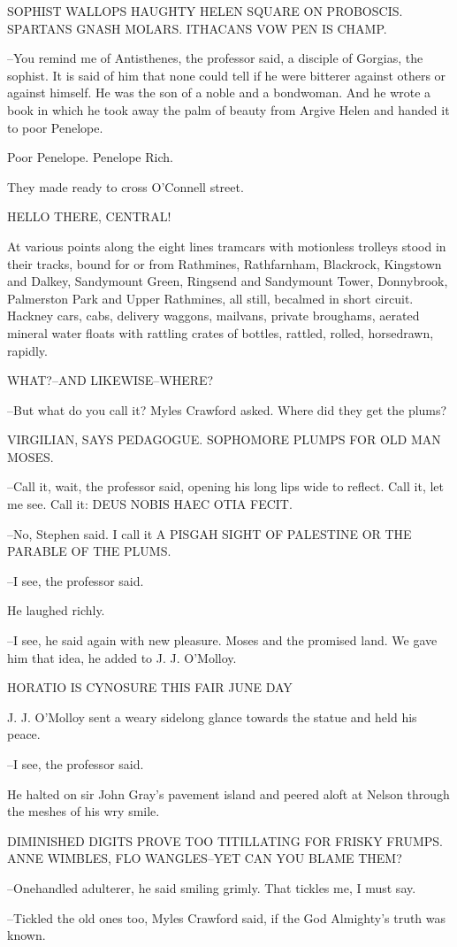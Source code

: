     SOPHIST WALLOPS HAUGHTY HELEN SQUARE ON
    PROBOSCIS. SPARTANS GNASH MOLARS. ITHACANS
    VOW PEN IS CHAMP.


--You remind me of Antisthenes, the professor said, a disciple of
Gorgias, the sophist. It is said of him that none could tell if he were
bitterer against others or against himself. He was the son of a noble and
a bondwoman. And he wrote a book in which he took away the palm of beauty
from Argive Helen and handed it to poor Penelope.

Poor Penelope. Penelope Rich.

They made ready to cross O'Connell street.


    HELLO THERE, CENTRAL!


At various points along the eight lines tramcars with motionless
trolleys stood in their tracks, bound for or from Rathmines, Rathfarnham,
Blackrock, Kingstown and Dalkey, Sandymount Green, Ringsend and
Sandymount Tower, Donnybrook, Palmerston Park and Upper Rathmines,
all still, becalmed in short circuit. Hackney cars, cabs, delivery
waggons, mailvans, private broughams, aerated mineral water floats with
rattling crates of bottles, rattled, rolled, horsedrawn, rapidly.



    WHAT?--AND LIKEWISE--WHERE?


--But what do you call it? Myles Crawford asked. Where did they get the
plums?


    VIRGILIAN, SAYS PEDAGOGUE.
    SOPHOMORE PLUMPS FOR OLD MAN MOSES.


--Call it, wait, the professor said, opening his long lips wide to
reflect. Call it, let me see. Call it: DEUS NOBIS HAEC OTIA FECIT.

--No, Stephen said. I call it A PISGAH SIGHT OF PALESTINE OR THE PARABLE
OF THE PLUMS.

--I see, the professor said.

He laughed richly.

--I see, he said again with new pleasure. Moses and the promised land. We
gave him that idea, he added to J. J. O'Molloy.


    HORATIO IS CYNOSURE THIS FAIR JUNE DAY


J. J. O'Molloy sent a weary sidelong glance towards the statue and
held his peace.

--I see, the professor said.

He halted on sir John Gray's pavement island and peered aloft at Nelson
through the meshes of his wry smile.


    DIMINISHED DIGITS PROVE TOO TITILLATING
    FOR FRISKY FRUMPS. ANNE WIMBLES, FLO
    WANGLES--YET CAN YOU BLAME THEM?


--Onehandled adulterer, he said smiling grimly. That tickles me, I must
say.

--Tickled the old ones too, Myles Crawford said, if the God Almighty's
truth was known.



